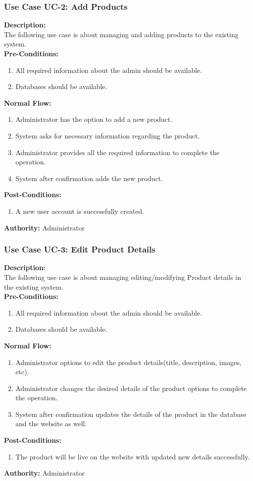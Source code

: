 \subsubsection{Use Case UC-2: Add Products }
\textbf{Description:}\\
The following use case is about managing and adding products to the existing system.
\\
\textbf{Pre-Conditions:}
\begin{enumerate}
    \item  All required information about the admin should be available.
    \item Databases should be available.
\end{enumerate}
\textbf{Normal Flow:}\\
\begin{enumerate}
\item Administrator has the option to add a new product.
\item System asks for necessary information regarding the product.
\item Administrator provides all the required information to complete the operation.
\item System after confirmation adds the new product.
\end{enumerate}
\textbf{Post-Conditions: }
\begin{enumerate}
\item	A new user account is successfully created.
\end{enumerate}
\textbf{Authority:}
Administrator
\subsubsection{ Use Case UC-3: Edit Product Details}
\textbf{Description:}\\
The following use case is about managing editing/modifying Product details in the existing system.
\\
\textbf{Pre-Conditions:}
\begin{enumerate}
    \item  All required information about the admin should be available.
    \item Databases should be available.
\end{enumerate}
\textbf{Normal Flow:}\\
\begin{enumerate}
\item Administrator options to edit the product details(title, description, images, etc).
\item Administrator changes the desired details of the product options to complete the operation.
\item System after confirmation updates the details of the product in the database and the website as well.
\end{enumerate}
\textbf{Post-Conditions: }
\begin{enumerate}
\item	The product will be live on the website with updated new details successfully.
\end{enumerate}
\textbf{Authority:}
Administrator
